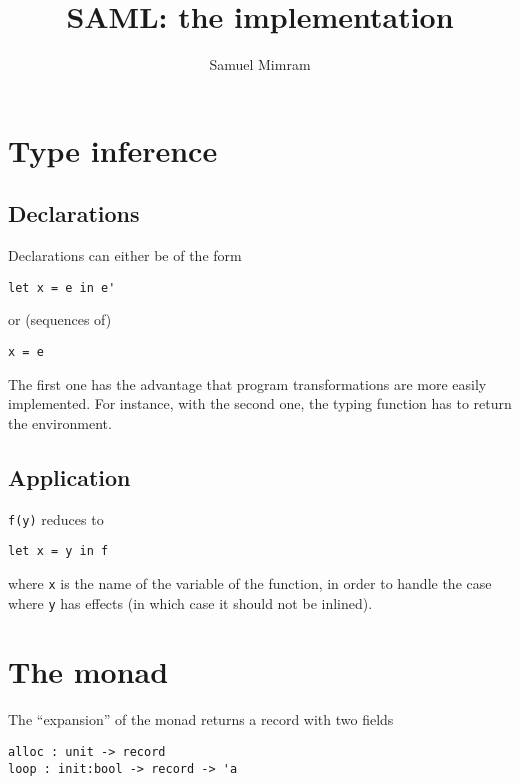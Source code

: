 \documentclass[a4paper]{article}
\title{SAML: the implementation}
\author{Samuel Mimram}
\begin{document}
\maketitle

\section{Type inference}
\subsection{Declarations}
Declarations can either be of the form
\begin{verbatim}
let x = e in e'
\end{verbatim}
or (sequences of)
\begin{verbatim}
x = e
\end{verbatim}
The first one has the advantage that program transformations are more easily
implemented. For instance, with the second one, the typing function has to
return the environment.

\subsection{Application}
\texttt{f(y)} reduces to
\begin{verbatim}
let x = y in f
\end{verbatim}
where \texttt{x} is the name of the variable of the function, in order to handle
the case where \texttt{y} has effects (in which case it should not be inlined).

\section{The monad}
The ``expansion'' of the monad returns a record with two fields
\begin{verbatim}
alloc : unit -> record
loop : init:bool -> record -> 'a
\end{verbatim}
\end{document}
